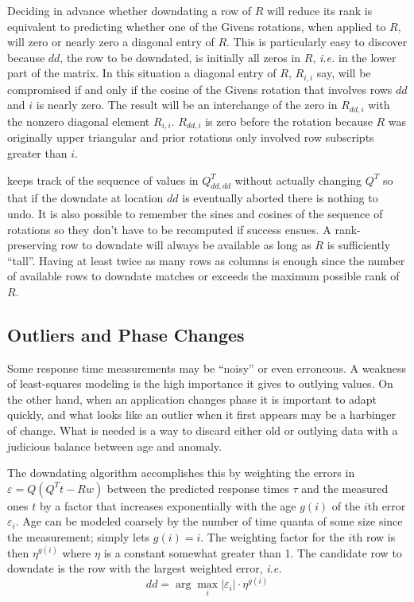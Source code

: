 Deciding in advance whether downdating a row of $R$ will reduce its rank
is equivalent to predicting whether one of the Givens rotations, when applied to $R$,
will zero or nearly zero a diagonal entry of $R$.
This is particularly easy to discover because $dd$, the row to be downdated, is initially all zeros in $R$,
\emph{i.e.} in the lower part of the matrix.
In this situation a diagonal entry of $R$, $R_{i,i}$ say, will be compromised if and only if the
cosine of the Givens rotation that involves rows $dd$ and $i$ is nearly zero.
The result will be an interchange of the zero in $R_{dd,i}$ with the nonzero diagonal element $R_{i,i}$.
$R_{dd,i}$ is zero before the rotation because
$R$ was originally upper triangular and prior rotations only involved row subscripts greater than $i$.

\pacora keeps track of the sequence of values in $Q^T_{dd,dd}$ without actually changing $Q^T$
so that if the downdate at location $dd$ is eventually aborted there is nothing to undo.
It is also possible to remember the sines and cosines of the sequence of rotations
so they don't have to be recomputed if success ensues.
A rank-preserving row to downdate will always be available as long as $R$ is sufficiently ``tall''.
Having at least twice as many rows as columns is enough since the number of available rows to downdate
matches or exceeds the maximum possible rank of $R$.

\subsection*{Outliers and Phase Changes}

Some response time measurements may be ``noisy'' or even erroneous.
A weakness of least-squares modeling is the high importance it gives to outlying values.
On the other hand, when an application changes phase it is important to adapt quickly,
and what looks like an outlier when it first appears may be a harbinger of change.
What is needed is a way to discard either old or outlying data
with a judicious balance between age and anomaly.

The downdating algorithm accomplishes this by weighting the errors in $\varepsilon = Q(Q^Tt - Rw)$
between the predicted response times $\tau$ and the measured ones $t$ by a factor
that increases exponentially with the age $g(i)$ of the $i$th error $\varepsilon_i$.
Age can be modeled coarsely by the number of time quanta of some size since the measurement;
\pacora simply lets $g(i) = i$.
The weighting factor for the $i$th row is then $\eta^{g(i)}$ where $\eta$ is a constant somewhat greater than 1.
The candidate row to downdate is the row with the largest weighted error, \emph{i.e.}
\begin{displaymath}
dd = \arg\max_i |\varepsilon_i| \cdot \eta^{g(i)}
\end{displaymath}

